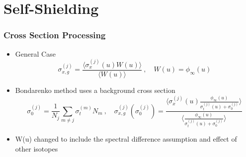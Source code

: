 \documentclass[xcolor=x11names,compress]{beamer}
\renewcommand{\(}{\begin{columns}}
\renewcommand{\)}{\end{columns}}
\newcommand{\<}[1]{\begin{column}{#1}}
\renewcommand{\>}{\end{column}}
\newcommand{\micro}{\ensuremath{\sigma}}
\begin{document}
\section{Self-Shielding}
\begin{frame}[fragile]
  \frametitle{Cross Section Processing \cite{Bondarenko1964}}

	\begin{itemize}
	\item General Case
	\begin{equation}
  	\micro_{x,g}^{(j)} = \frac{\langle \micro_x^{(j)}(u) W(u)\rangle}
	{\langle W(u)\rangle} \:, \quad W(u) = \phi_{\infty}(u)
 	 \label{eq:baseBondarenko}
 	\end{equation} 
 	
 	\pause
 	\item Bondarenko method uses a background cross section
 	\begin{equation}
  	\micro_0^{(j)} = \frac{1}{N_j} \sum_{m \ne j} \micro_{t}^{(m)} N_m 
  	\:, \quad \micro_{x,g}^{(j)}(\micro_0^{(j)}) = \frac{\langle
  	 \micro_{x}^{(j)}(u) \frac{\phi_{\infty}(u)} {\micro_{t}^{(j)}(u)
  	 + \micro_0^{(j)}} \rangle}
  	 { \langle \frac{\phi_{\infty}(u)}{\micro_{t}^{(j)}(u) +
  	 \micro_0^{(j)}}\rangle}
  \label{eq:ssfact}
	\end{equation}

    \pause
	\item W(u) changed to include the  spectral difference assumption and effect of other isotopes
	\end{itemize}
	
\end{frame}
	
\end{document}
